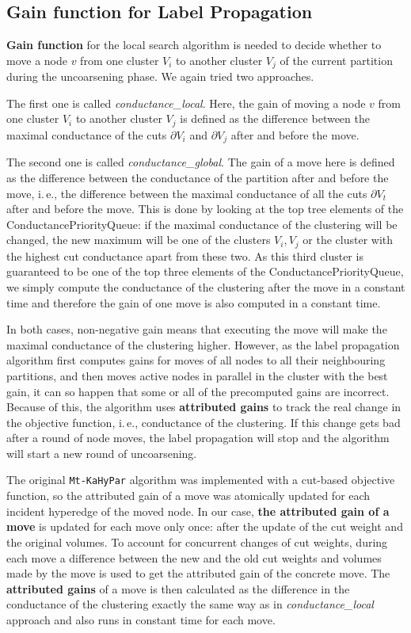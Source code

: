 \documentclass[acmsmall,nonacm,screen,review]{acmart}
\newcommand{\ie}{i.\,e.,\xspace}
\begin{document}
\subsection{Gain function for Label Propagation}
\noindent\textbf{Gain function} for the local search algorithm is needed
to decide whether to move a node $v$ from one cluster $V_i$ to
another cluster $V_j$ of the current partition during the uncoarsening
phase. We again tried two approaches.

The first one is called \textit{conductance\_local}. Here, the gain of
moving a node $v$ from one cluster $V_i$ to another cluster $V_j$ is
defined as the difference between the maximal conductance of the 
cuts $\partial V_i$ and $\partial V_j$ after and before the move.

The second one is called \textit{conductance\_global}. The gain of a move
here is defined as the difference between the conductance of the partition 
after and before the move, \ie the difference between the maximal conductance
of all the cuts $\partial V_t$ after and before the move. This is done by
looking at the top tree elements of the ConductancePriorityQueue: if the maximal
conductance of the clustering will be changed, the new maximum will be
one of the clusters $V_i, V_j$ or the cluster with the highest cut conductance
apart from these two. As this third cluster is guaranteed to be one of the
top three elements of the ConductancePriorityQueue, we simply compute the 
conductance of the clustering after the move in a constant time and therefore
the gain of one move is also computed in a constant time.

\smallskip
In both cases, non-negative gain means that executing the move will 
make the maximal conductance of the clustering higher. However,
as the label propagation algorithm first computes gains for moves
of all nodes to all their neighbouring partitions, and then moves
active nodes in parallel in the cluster with the best gain, it can so 
happen that some or all of the precomputed gains are incorrect.
Because of this, the algorithm uses \textbf{attributed gains} to
track the real change in the objective function, \ie conductance 
of the clustering. If this change gets bad after a round of node moves,
the label propagation will stop and the algorithm will start a new round
of uncoarsening.

The original \texttt{Mt-KaHyPar} algorithm was implemented
with a cut-based objective function, so the attributed gain of a move
was atomically updated for each incident hyperedge of the moved node.
In our case, \textbf{the attributed gain of a move} is updated for each move 
only once: after the update of the cut weight and the original volumes.
To account for concurrent changes of cut weights, during each move
a difference between the new and the old cut weights and volumes
made by the move is used to get the attributed gain of the concrete move.
The \textbf{attributed gains} of a move is then calculated as the difference
in the conductance of the clustering exactly the same way as in 
\textit{conductance\_local} approach and also runs in constant time for each move. 
\end{document}
